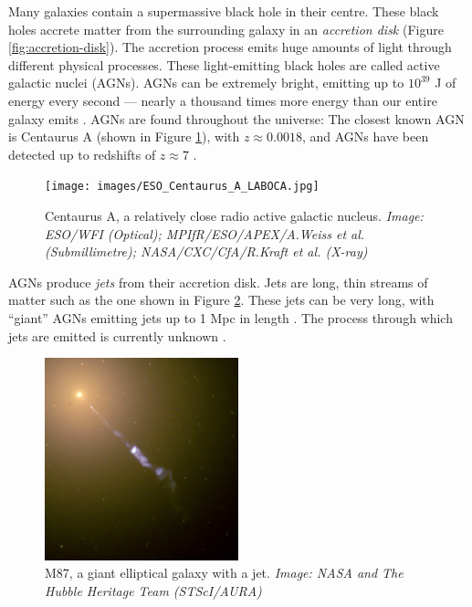         Many galaxies contain a supermassive black hole in their centre. These black holes accrete matter from the surrounding galaxy in an \emph{accretion disk} (Figure \ref{fig:accretion-disk}). The accretion process emits huge amounts of light through different physical processes. These light-emitting black holes are called active galactic nuclei (AGNs). AGNs can be extremely bright, emitting up to $10^{39}$ J of energy every second --- nearly a thousand times more energy than our entire galaxy emits \citep{begelman84}. AGNs are found throughout the universe: The closest known AGN is Centaurus A (shown in Figure \ref{fig:centaurus-a}), with $z \approx 0.0018$, and AGNs have been detected up to redshifts of $z \approx 7$ .

        \begin{figure}[!ht]
            \centering
            \texttt{[image: images/ESO\_Centaurus\_A\_LABOCA.jpg]}
            \caption{Centaurus A, a relatively close radio active galactic nucleus. \emph{Image: ESO/WFI (Optical); MPIfR/ESO/APEX/A.Weiss et al. (Submillimetre); NASA/CXC/CfA/R.Kraft et al. (X-ray)}}
            \label{fig:centaurus-a}
        \end{figure}

        AGNs produce \emph{jets} from their accretion disk. Jets are long, thin streams of matter such as the one shown in Figure \ref{fig:m87}. These jets can be very long, with ``giant'' AGNs emitting jets up to 1 Mpc in length . The process through which jets are emitted is currently unknown .

        \begin{figure}[!ht]
            \centering
            \includegraphics[width=0.5\textwidth]{images/M87_jet.jpg}
            \caption{M87, a giant elliptical galaxy with a jet. \emph{Image: NASA and The Hubble Heritage Team (STScI/AURA)}}
            \label{fig:m87}
        \end{figure}

